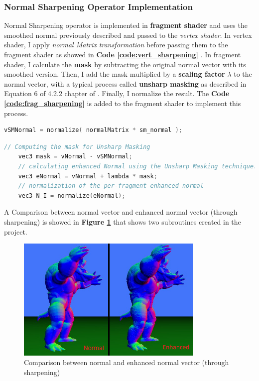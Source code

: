 \subsubsection{Normal Sharpening Operator Implementation}
Normal Sharpening operator is implemented in \textbf{fragment shader} and uses the smoothed normal previously described and passed to the \textit{vertex shader}. \newline
In vertex shader, I apply \textit{normal Matrix transformation} before passing them to the fragment shader as showed in \textbf{Code \ref{code:vert_sharpening}} . \newline
In fragment shader, I calculate the \textbf{mask} by subtracting the original normal vector with its smoothed version. Then, I add the mask multiplied by a \textbf{scaling factor} $\lambda$ to the normal vector, with a typical process called \textbf{unsharp masking} as described in Equation 6 of 4.2.2 chapter of \cite{referencePaper}. Finally, I normalize the result. \newline
The \textbf{Code \ref{code:frag_sharpening}} is added to the fragment shader to implement this process.
\begin{lstlisting}[language=C++, caption=Transformation applied to smoothed normal in vertex shader,label={code:vert_sharpening}]
	vSMNormal = normalize( normalMatrix * sm_normal );
\end{lstlisting}
\begin{lstlisting}[language=C++, caption=Calculation of normal sharpening operator in fragment shader,label={code:frag_sharpening}]
	// Computing the mask for Unsharp Masking
	vec3 mask = vNormal - vSMNormal;
	// calculating enhanced Normal using the Unsharp Masking technique. This is defined, in the reference paper, in equation 6 of chapter 4.2.2
	vec3 eNormal = vNormal + lambda * mask;
	// normalization of the per-fragment enhanced normal 
	vec3 N_I = normalize(eNormal);	
\end{lstlisting}
A Comparison between normal vector and enhanced normal vector (through sharpening) is showed in \textbf{Figure \ref{fig:normal_comparison}} that shows two subroutines created in the project.
\pagebreak
\begin{figure}[h]
	\centering
	\includegraphics[width=0.8\textwidth]{Images/normal_comparison.png}
	\caption{Comparison between normal and enhanced normal vector (through sharpening)}
	\label{fig:normal_comparison}
\end{figure}